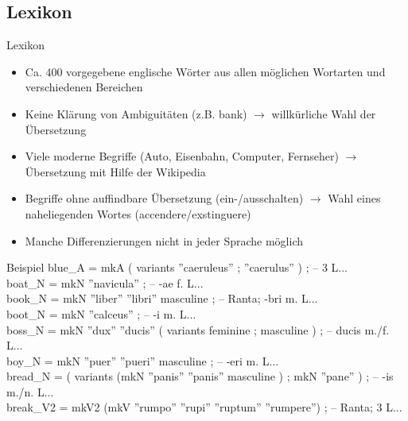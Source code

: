 \documentclass{beamer}
\begin{document}
\subsection{Lexikon}
\begin{frame}{Lexikon}
\begin{itemize}
  \item Ca. 400 vorgegebene englische Wörter aus allen möglichen Wortarten und verschiedenen Bereichen
  \item Keine Klärung von Ambiguitäten (z.B. bank) $\rightarrow$ willkürliche Wahl der Übersetzung
  \item Viele moderne Begriffe (Auto, Eisenbahn, Computer, Fernseher) $\rightarrow$ Übersetzung mit Hilfe der Wikipedia
  \item Begriffe ohne auffindbare Übersetzung (ein-/ausschalten) $\rightarrow$ Wahl eines naheliegenden Wortes (accendere/exstinguere)
  \item Manche Differenzierungen nicht in jeder Sprache möglich
\end{itemize}
\end{frame}
\begin{frame}{}
\begin{block}{Beispiel}
{\scriptsize\ttfamily
  blue\_A = mkA ( variants { ''caeruleus'' ; ''caerulus'' } ) ; -- 3 L... \\
  boat\_N = mkN ''navicula'' ; -- -ae f. L... \\
  book\_N = mkN ''liber'' ''libri'' masculine ; -- Ranta; -bri m. L... \\
  boot\_N = mkN ''calceus'' ; -- -i m. L... \\
  boss\_N = mkN ''dux'' ''ducis'' ( variants { feminine ; masculine } ) ; -- ducis m./f. L... \\
  boy\_N = mkN ''puer'' ''pueri'' masculine ; -- -eri m. L... \\
  bread\_N = ( variants { (mkN ''panis'' ''panis'' masculine ) ; mkN ''pane'' } ) ; -- -is m./n. L...  \\
  break\_V2 = mkV2 (mkV ''rumpo'' ''rupi'' ''ruptum'' ''rumpere'') ; -- Ranta; 3 L...
}
\end{block}
\end{frame}
\end{document}

